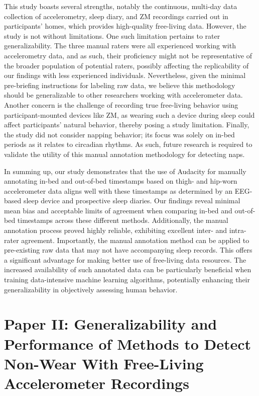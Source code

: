 \documentclass[
  10pt,
]{scrbook}
\begin{document}
This study boasts several strengths, notably the continuous, multi-day
data collection of accelerometry, sleep diary, and ZM recordings carried
out in participants' homes, which provides high-quality free-living
data. However, the study is not without limitations. One such limitation
pertains to rater generalizability. The three manual raters were all
experienced working with accelerometry data, and as such, their
proficiency might not be representative of the broader population of
potential raters, possibly affecting the replicability of our findings
with less experienced individuals. Nevertheless, given the minimal
pre-briefing instructions for labeling raw data, we believe this
methodology should be generalizable to other researchers working with
accelerometer data. Another concern is the challenge of recording true
free-living behavior using participant-mounted devices like ZM, as
wearing such a device during sleep could affect participants' natural
behavior, thereby posing a study limitation. Finally, the study did not
consider napping behavior; its focus was solely on in-bed periods as it
relates to circadian rhythms. As such, future research is required to
validate the utility of this manual annotation methodology for detecting
naps.

In summing up, our study demonstrates that the use of Audacity for
manually annotating in-bed and out-of-bed timestamps based on thigh- and
hip-worn accelerometer data aligns well with these timestamps as
determined by an EEG-based sleep device and prospective sleep diaries.
Our findings reveal minimal mean bias and acceptable limits of agreement
when comparing in-bed and out-of-bed timestamps across these different
methods. Additionally, the manual annotation process proved highly
reliable, exhibiting excellent inter- and intra-rater agreement.
Importantly, the manual annotation method can be applied to pre-existing
raw data that may not have accompanying sleep records. This offers a
significant advantage for making better use of free-living data
resources. The increased availability of such annotated data can be
particularly beneficial when training data-intensive machine learning
algorithms, potentially enhancing their generalizability in objectively
assessing human behavior.

\hypertarget{paper-ii-generalizability-and-performance-of-methods-to-detect-non-wear-with-free-living-accelerometer-recordings}{%
\chapter{Paper II: Generalizability and Performance of Methods to Detect
Non-Wear With Free-Living Accelerometer
Recordings}\label{paper-ii-generalizability-and-performance-of-methods-to-detect-non-wear-with-free-living-accelerometer-recordings}}
\end{document}
